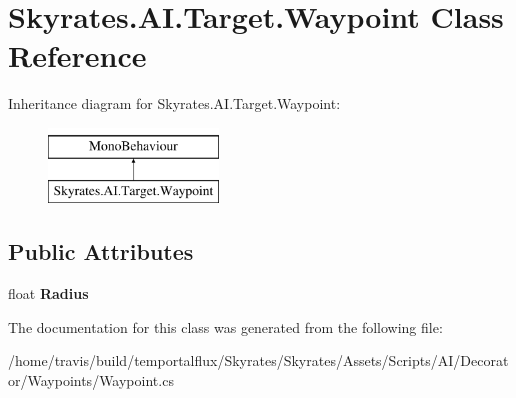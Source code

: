 \hypertarget{class_skyrates_1_1_a_i_1_1_target_1_1_waypoint}{\section{Skyrates.\-A\-I.\-Target.\-Waypoint Class Reference}
\label{class_skyrates_1_1_a_i_1_1_target_1_1_waypoint}
}
Inheritance diagram for Skyrates.\-A\-I.\-Target.\-Waypoint\-:\begin{figure}[H]
\begin{center}
\leavevmode
\includegraphics[height=2.000000cm]{class_skyrates_1_1_a_i_1_1_target_1_1_waypoint}
\end{center}
\end{figure}
\subsection*{Public Attributes}
\begin{DoxyCompactItemize}
\item 
\hypertarget{class_skyrates_1_1_a_i_1_1_target_1_1_waypoint_a6a8cfa9cae3d62cdaecd8caa8309b81b}{float {\bfseries Radius}}\label{class_skyrates_1_1_a_i_1_1_target_1_1_waypoint_a6a8cfa9cae3d62cdaecd8caa8309b81b}

\end{DoxyCompactItemize}


The documentation for this class was generated from the following file\-:\begin{DoxyCompactItemize}
\item 
/home/travis/build/temportalflux/\-Skyrates/\-Skyrates/\-Assets/\-Scripts/\-A\-I/\-Decorator/\-Waypoints/Waypoint.\-cs\end{DoxyCompactItemize}
